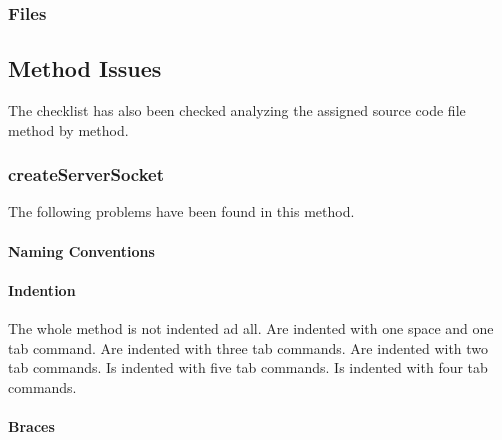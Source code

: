 \subsubsection{Files}
\begin{itemize}
\end{itemize}


\subsection{Method Issues}
The checklist has also been checked analyzing the assigned source code file method by method.

\subsubsection{createServerSocket}
The following problems have been found in this method.

\paragraph{Naming Conventions}
\begin{itemize}
\end{itemize}

\paragraph{Indention}
\begin{itemize}
	 	\begin{itemize}
				The whole method is not indented ad all.
				Are indented with one space and one tab command.
				Are indented with three tab commands.
				Are indented with two tab commands.
				Is indented with five tab commands.
				Is indented with four tab commands.
		\end{itemize}
	\checklist{9}
\end{itemize}

\paragraph{Braces}
\begin{itemize}
	\checklist{10}
	\checklist{11}
\end{itemize}

